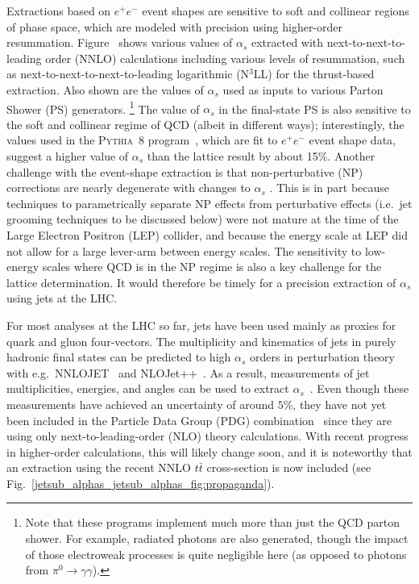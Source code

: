 \documentclass[11pt]{cernrep}
\begin{document}
Extractions based on $e^+e^-$ event shapes are sensitive to soft and collinear regions of phase space, which are modeled with precision
using higher-order resummation.
%
Figure~\cite{jetsub_alphas_jetsub_alphas_fig:propaganda} shows various values of $\alpha_s$ extracted with next-to-next-to-leading order (NNLO) calculations including various levels of resummation, such as next-to-next-to-next-to-leading logarithmic (N$^3$LL) for the thrust-based extraction.
%
Also shown are the values of $\alpha_s$ used as inputs to various Parton Shower (PS) generators.%
\footnote{Note that these programs implement much more than just the QCD parton shower.  For example, radiated photons are also generated, though the impact of those electroweak processes is quite negligible here (as opposed to photons from $\pi^0\rightarrow\gamma\gamma$).}
%
The value of $\alpha_s$ in the final-state PS is also sensitive to the soft and collinear regime of QCD (albeit in different ways); interestingly, the values used in the \textsc{Pythia~8} program~\cite{Sjostrand:2006za,Sjostrand:2007gs}, which are fit to $e^+e^-$ event shape data, suggest a higher value of $\alpha_s$ than the lattice result by about 15\%.
%
Another challenge with the event-shape extraction is that non-perturbative (NP) corrections are nearly degenerate with changes to $\alpha_s$ \cite{Abbate:2010xh}.
%
This is in part because techniques to parametrically separate NP effects from perturbative effects (i.e.~jet grooming techniques to be discussed below) were not mature at the time of the Large Electron Positron (LEP) collider, and because the energy scale at LEP did not allow for a large lever-arm between energy scales.
%
The sensitivity to low-energy scales where QCD is in the NP regime is also a key challenge for the lattice determination.
%
It would therefore be timely for a precision extraction of $\alpha_s$ using jets at the LHC.

For most analyses at the LHC so far, jets have been used mainly as proxies for quark and gluon four-vectors.
%
The multiplicity and kinematics of jets in purely hadronic final states can be predicted to high $\alpha_s$ orders in perturbation theory with e.g.\ NNLOJET~\cite{Currie:2016bfm,Currie:2017ctp} and NLOJet++~\cite{Nagy:2001fj,Nagy:2003tz}.
%
As a result, measurements of jet multiplicities, energies, and angles can be used to extract $\alpha_s$~\cite{ATLAS:2015yaa,Aaboud:2017fml,Khachatryan:2014waa,CMS:2014mna,Chatrchyan:2013txa}.
%
Even though these measurements have achieved an uncertainty of around $5\%$, they have not yet been included in the Particle Data Group (PDG) combination~\cite{Olive:2016xmw} since they are using only next-to-leading-order (NLO) theory calculations.
%
With recent progress in higher-order calculations, this will likely change soon, and it is noteworthy that an extraction using the recent NNLO $t\bar{t}$ cross-section \cite{Czakon:2013goa} is now included (see Fig.~\ref{jetsub_alphas_jetsub_alphas_fig:propaganda}).
\end{document}
